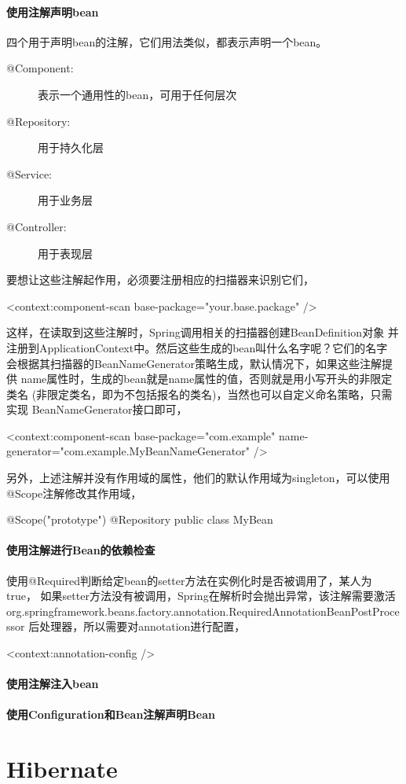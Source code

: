 \documentclass[a4paper,11pt]{article}
\begin{document}
\subsection[使用注解创建bean]{使用注解声明bean}
四个用于声明bean的注解，它们用法类似，都表示声明一个bean。
\begin{description}
\item [@Component: ] 表示一个通用性的bean，可用于任何层次
\item [@Repository: ] 用于持久化层
\item [@Service: ] 用于业务层
\item [@Controller: ] 用于表现层
\end{description}
要想让这些注解起作用，必须要注册相应的扫描器来识别它们，

\begin{xmlcode}
<context:component-scan base-package="your.base.package" />
\end{xmlcode}

这样，在读取到这些注解时，Spring调用相关的扫描器创建BeanDefinition对象
并注册到ApplicationContext中。然后这些生成的bean叫什么名字呢？它们的名字
会根据其扫描器的BeanNameGenerator策略生成，默认情况下，如果这些注解提供
name属性时，生成的bean就是name属性的值，否则就是用小写开头的非限定类名
(非限定类名，即为不包括报名的类名)，当然也可以自定义命名策略，只需实现
BeanNameGenerator接口即可，

\begin{xmlcode}
<context:component-scan
  base-package="com.example"
  name-generator="com.example.MyBeanNameGenerator" />
\end{xmlcode}

另外，上述注解并没有作用域的属性，他们的默认作用域为singleton，可以使用
@Scope注解修改其作用域，

\begin{javacode}
  @Scope("prototype")
  @Repository
  public class MyBean { }
\end{javacode}

\subsection[使用注解进行Bean的依赖检查]{使用注解进行Bean的依赖检查}
使用@Required判断给定bean的setter方法在实例化时是否被调用了，某人为true，
如果setter方法没有被调用，Spring在解析时会抛出异常，该注解需要激活
org.springframework.beans.factory.annotation.RequiredAnnotationBeanPostProcessor
后处理器，所以需要对annotation进行配置，

\begin{xmlcode}
  <context:annotation-config />
\end{xmlcode}

\subsection[使用注解注入bean]{使用注解注入bean}

\subsection[使用Configuration和Bean注解声明Bean]{使用Configuration和Bean注解声明Bean}


\part[Hibernate]{Hibernate}
\end{document}
